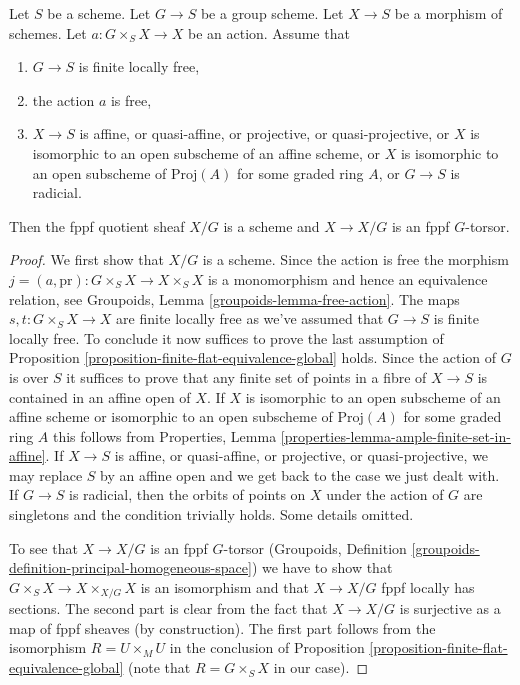 \begin{lemma}
\label{lemma-quotient-scheme}
Let $S$ be a scheme. Let $G \to S$ be a group scheme. Let $X \to S$ be
a morphism of schemes. Let $a : G \times_S X \to X$ be an action. Assume that
\begin{enumerate}
\item $G \to S$ is finite locally free,
\item the action $a$ is free,
\item $X \to S$ is affine, or quasi-affine, or projective, or
quasi-projective, or $X$ is isomorphic to an open subscheme of an
affine scheme, or $X$ is isomorphic to an open subscheme of $\text{Proj}(A)$
for some graded ring $A$, or $G \to S$ is radicial.
\end{enumerate}
Then the fppf quotient sheaf $X/G$ is a scheme and $X \to X/G$
is an fppf $G$-torsor.
\end{lemma}

\begin{proof}
We first show that $X/G$ is a scheme. Since the action is free the morphism
$j = (a, \text{pr}) : G \times_S X \to X \times_S X$
is a monomorphism and hence an equivalence relation, see
Groupoids, Lemma \ref{groupoids-lemma-free-action}. The maps
$s, t : G \times_S X \to X$
are finite locally free as we've assumed that $G \to S$ is finite locally
free. To conclude it now suffices to prove the last assumption of
Proposition \ref{proposition-finite-flat-equivalence-global} holds.
Since the action of $G$ is over $S$ it suffices to prove that
any finite set of points in a fibre of $X \to S$ is contained in an
affine open of $X$. If $X$ is isomorphic to an open subscheme of an
affine scheme or isomorphic to an open subscheme of $\text{Proj}(A)$
for some graded ring $A$ this follows from
Properties, Lemma \ref{properties-lemma-ample-finite-set-in-affine}.
If $X \to S$ is affine, or quasi-affine, or projective, or
quasi-projective, we may replace $S$ by an affine open and we
get back to the case we just dealt with. If $G \to S$ is radicial,
then the orbits of points on $X$ under the action of $G$ are singletons
and the condition trivially holds. Some details omitted.

\medskip\noindent
To see that $X \to X/G$ is an fppf $G$-torsor
(Groupoids, Definition \ref{groupoids-definition-principal-homogeneous-space})
we have to show that $G \times_S X \to X \times_{X/G} X$
is an isomorphism and that $X \to X/G$ fppf locally has sections.
The second part is clear from the fact that $X \to X/G$ is surjective
as a map of fppf sheaves (by construction). The first part follows from
the isomorphism $R = U \times_M U$ in the conclusion of
Proposition \ref{proposition-finite-flat-equivalence-global}
(note that $R = G \times_S X$ in our case).
\end{proof}

